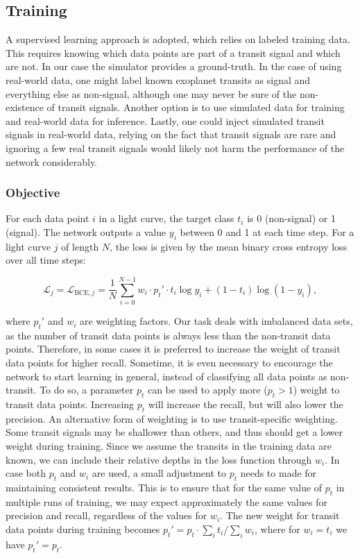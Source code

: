 \subsection{Training}
A supervised learning approach is adopted, which relies on labeled training data. This requires knowing which data points are part of a transit signal and which are not. In our case the simulator provides a ground-truth. In the case of using real-world data, one might label known exoplanet transits as signal and everything else as non-signal, although one may never be sure of the non-existence of transit signals. Another option is to use simulated data for training and real-world data for inference. Lastly, one could inject simulated transit signals in real-world data, relying on the fact that transit signals are rare and ignoring a few real transit signals would likely not harm the performance of the network considerably.

\subsubsection{Objective}
For each data point $i$ in a light curve, the target class $t_i$ is 0 (non-signal) or 1 (signal). The network outputs a value $y_i$ between 0 and 1 at each time step. For a light curve $j$ of length $N$, the loss is given by the mean binary cross entropy loss over all time steps:

\begin{equation}
    \label{eq:objective}
    \mathcal{L}_{j} = \mathcal{L}_{\text{BCE}, j} = \frac{1}{N} \sum_{i=0}^{N-1} w_i \cdot p_t' \cdot t_i \log y_i + (1-t_i) \log (1-y_i),
\end{equation}


\noindent where $p_t'$ and $w_i$ are weighting factors. Our task deals with imbalanced data sets, as the number of transit data points is always less than the non-transit data points. Therefore, in some cases it is preferred to increase the weight of transit data points for higher recall. Sometime, it is even necessary to encourage the network to start learning in general, instead of classifying all data points as non-transit. To do so, a parameter $p_t$ can be used to apply more ($p_t > 1$) weight to transit data points. Increasing $p_t$ will increase the recall, but will also lower the precision. An alternative form of weighting is to use transit-specific weighting. Some transit signals may be shallower than others, and thus should get a lower weight during training. Since we assume the transits in the training data are known, we can include their relative depths in the loss function through $w_i$. In case both $p_t$ and $w_i$ are used, a small adjustment to $p_t$ needs to made for maintaining consistent results. This is to ensure that for the same value of $p_t$ in multiple runs of training, we may expect approximately the same values for precision and recall, regardless of the values for $w_i$. The new weight for transit data points during training becomes  $p_t' = p_t \cdot \sum_i t_i / \sum_i w_i$, where for $w_i = t_i$ we have $p_t' = p_t$.


